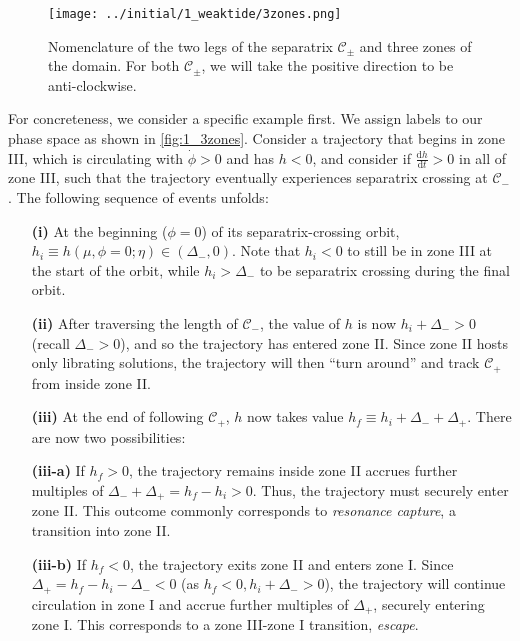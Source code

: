\documentclass[
        fleqn,
        usenatbib,
    ]{mnras}
\newcommand*{\rd}[2]{\frac{\mathrm{d}#1}{\mathrm{d}#2}}
\begin{document}
\begin{figure}
    \centering
    \texttt{[image: ../initial/1\_weaktide/3zones.png]}
    \caption{Nomenclature of the two legs of the separatrix $\mathcal{C}_{\pm}$
    and three zones of the domain. For both $\mathcal{C}_{\pm}$, we will take
    the positive direction to be anti-clockwise.}\label{fig:1_3zones}
\end{figure}
For concreteness, we consider a specific example first. We assign labels to our
phase space as shown in \autoref{fig:1_3zones}. Consider a trajectory that
begins in zone III, which is circulating with $\dot{\phi} > 0$ and has $h < 0$,
and consider if $\rd{h}{t} > 0$ in all of zone III, such that the trajectory
eventually experiences separatrix crossing at $\mathcal{C}_-$. The following
sequence of events unfolds:
\begin{enumerate}
    \item[\textbf{(i)}] At the beginning ($\phi = 0$) of its separatrix-crossing
        orbit, $h_i \equiv h(\mu, \phi = 0; \eta) \in (\Delta_-, 0)$. Note
        that $h_i < 0$ to still be in zone III at the start of the orbit, while
        $h_i > \Delta_-$ to be separatrix crossing during the final orbit.

    \item[\textbf{(ii)}] After traversing the length of $\mathcal{C}_-$, the
        value of $h$ is now $h_i + \Delta_- > 0$ (recall $\Delta_- > 0$), and so
        the trajectory has entered zone II\@. Since zone II hosts only librating
        solutions, the trajectory will then ``turn around'' and track
        $\mathcal{C}_+$ from inside zone II\@.

    \item[\textbf{(iii)}] At the end of following $\mathcal{C}_+$, $h$ now takes
        value $h_f \equiv h_i + \Delta_- + \Delta_+$. There are now two
        possibilities:

    \item[\textbf{(iii-a)}] If $h_f > 0$, the trajectory remains inside zone II
        accrues further multiples of $\Delta_- + \Delta_+ = h_f - h_i > 0$.
        Thus, the trajectory must securely enter zone II\@. This outcome
        commonly corresponds to \emph{resonance capture}, a transition into zone
        II\@.

    \item[\textbf{(iii-b)}] If $h_f < 0$, the trajectory exits zone II and
        enters zone I\@. Since $\Delta_+ = h_f - h_i - \Delta_- < 0$ (as $h_f
        < 0, h_i + \Delta_- > 0$), the trajectory will continue circulation in
        zone I and accrue further multiples of $\Delta_+$, securely entering
        zone I\@. This corresponds to a zone III-zone I transition,
        \emph{escape}.
\end{enumerate}
\end{document}
